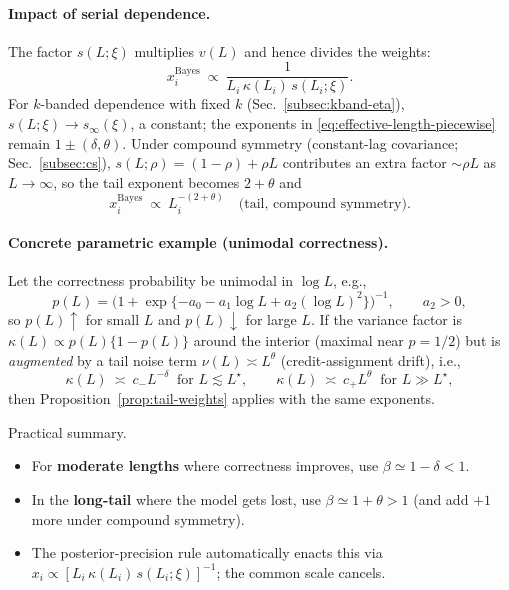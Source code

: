 \paragraph{Impact of serial dependence.}
The factor $s(L;\xi)$ multiplies $v(L)$ and hence divides the weights:
\[
x_i^{\mathrm{Bayes}}\ \propto\ \frac{1}{L_i\,\kappa(L_i)\,s(L_i;\xi)}.
\]
For $k$-banded dependence with fixed $k$ (Sec.~\ref{subsec:kband-eta}), $s(L;\xi)\to s_\infty(\xi)$, a constant; the exponents in \eqref{eq:effective-length-piecewise} remain $1\pm(\delta,\theta)$. Under compound symmetry (constant-lag covariance; Sec.~\ref{subsec:cs}), $s(L;\rho)=(1-\rho)+\rho L$ contributes an extra factor $\sim \rho L$ as $L\to\infty$, so the tail exponent becomes $2+\theta$ and
\[
x_i^{\mathrm{Bayes}}\ \propto\ L_i^{-(2+\theta)}\quad\text{(tail, compound symmetry)}.
\]

\paragraph{Concrete parametric example (unimodal correctness).}
Let the correctness probability be unimodal in $\log L$, e.g.,
\[
p(L)=\big(1+\exp\{-a_0-a_1\log L + a_2(\log L)^2\}\big)^{-1},
\qquad a_2>0,
\]
so $p(L)\uparrow$ for small $L$ and $p(L)\downarrow$ for large $L$. If the variance factor is $\kappa(L)\propto p(L)\{1-p(L)\}$ around the interior (maximal near $p=1/2$) but is \emph{augmented} by a tail noise term $\nu(L)\asymp L^{\theta}$ (credit-assignment drift), i.e.,
\[
\kappa(L)\ \asymp\ c_- L^{-\delta} \ \text{ for } L\lesssim L^\star,
\qquad
\kappa(L)\ \asymp\ c_+ L^{\theta} \ \text{ for } L\gg L^\star,
\]
then Proposition~\ref{prop:tail-weights} applies with the same exponents.

\begin{remark}
Practical summary.
    \begin{itemize}
    \item For \textbf{moderate lengths} where correctness improves, use \(\beta\simeq 1-\delta<1\).
    \item In the \textbf{long-tail} where the model gets lost, use \(\beta\simeq 1+\theta>1\) (and add $+1$ more under compound symmetry).
    \item The posterior-precision rule automatically enacts this via $x_i\propto [L_i\,\kappa(L_i)\,s(L_i;\xi)]^{-1}$; the common scale cancels.
\end{itemize}
\end{remark}



